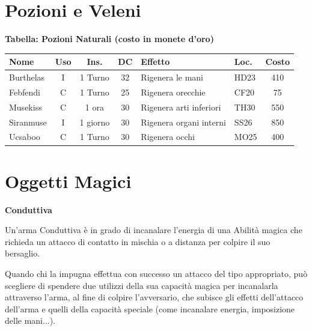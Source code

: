 \documentclass[a4paper,twoside,openany]{book}
\begin{document}
%

\pagebreak

\section{Pozioni e Veleni}

\textbf{Tabella: Pozioni Naturali (costo in monete d'oro)}\label{tabellapozioni}

{\small\noindent\begin{xltabular}{1\textwidth}{lcccXlc}
		\textbf{Nome}& \textbf{Uso} & \textbf{Ins.} & \textbf{DC} & \textbf{Effetto}& \textbf{Loc.} & \textbf{Costo} \\

\toprule
Burthelas  & I& 1 Turno & 32& Rigenera le mani& HD23 & 410\\
\toprule
Febfendi & C& 1 Turno & 25& Rigenera orecchie& CF20 & 75 \\
\toprule
Musekiss & C& 1 ora& 30& Rigenera arti inferiori & TH30 & 550\\
\toprule
Siranmuse& I& 1 giorno& 30& Rigenera organi interni & SS26 & 850\\
\toprule
Ucsaboo & C& 1 Turno & 30& Rigenera occhi& MO25 & 400\\
\end{xltabular}}\normalsize

\pagebreak

\section{Oggetti Magici}

\smallskip* \textbf{Conduttiva}\hypertarget{Conduttiva}{}

Un'arma Conduttiva è in grado di incanalare l'energia di una Abilità magica che richieda un attacco di contatto in mischia o a distanza per colpire il suo bersaglio.

Quando chi la impugna effettua con successo un attacco del tipo appropriato, può scegliere di spendere due utilizzi della sua capacità magica per incanalarla attraverso l'arma, al fine di colpire l'avversario, che subisce gli effetti dell'attacco dell'arma e quelli della capacità speciale (come incanalare energia, imposizione delle mani...).
\end{document}
